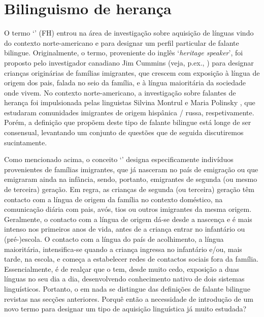 \documentclass[output=paper]{LSP/langsci}
\begin{document}
\section{Bilinguismo de herança}%
\label{sec:almeida_bilinguismo_heranca}

O termo `' (FH) entrou na área de investigação sobre aquisição de línguas vindo do contexto norte-americano e para designar um perfil particular de falante bilingue. Originalmente, o termo, proveniente do inglês `\textit{heritage speaker}', foi proposto pelo investigador canadiano Jim Cummins (veja, p.ex., \citealt{cummins1989}) para designar crianças originárias de famílias imigrantes, que crescem com exposição à língua de origem dos pais, falada no seio da família, e à língua maioritária da sociedade onde vivem. No contexto norte-americano, a investigação sobre falantes de herança foi impulsionada pelas linguistas Silvina Montrul e Maria Polinsky \citep{montrul2008,polinsky2008}, que estudaram comunidades imigrantes de origem hispânica / russa, respetivamente. Porém, a definição que propõem deste tipo de falante bilingue está longe de ser consensual, levantando um conjunto de questões que de seguida discutiremos sucintamente.

Como mencionado acima, o conceito `' designa especificamente indivíduos provenientes de famílias imigrantes, que já nasceram no país de emigração ou que emigraram ainda na infância, sendo, portanto, emigrantes de segunda (ou mesmo de terceira) geração. Em regra, as crianças de segunda (ou terceira) geração têm contacto com a língua de origem da família no contexto doméstico, na comunicação diária com pais, avós, tios ou outros imigrantes da mesma origem. Geralmente, o contacto com a língua de origem dá-se desde a nascença e é mais intenso nos primeiros anos de vida, antes de a criança entrar no infantário ou (pré-)escola. O contacto com a língua do país de acolhimento, a língua maioritária, intensifica-se quando a criança ingressa no infantário e/ou, mais tarde, na escola, e começa a estabelecer redes de contactos sociais fora da família. Essencialmente, é de realçar que o  tem, desde muito cedo, exposição a duas línguas no seu dia a dia, desenvolvendo conhecimento nativo de dois sistemas linguísticos. Portanto, o  em nada se distingue das definições de falante bilingue revistas nas secções anteriores. Porquê então a necessidade de introdução de um novo termo para designar um tipo de aquisição linguística já muito estudada?
\end{document}
